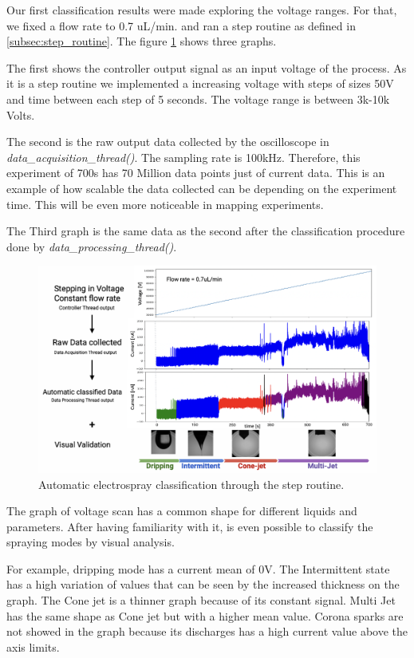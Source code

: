 Our first classification results were made exploring the voltage ranges. 
For that, we fixed a flow rate to 0.7 uL/min. and ran a step routine as defined in \ref{subsec:step_routine}. 
The figure \ref{fig:step_class} shows three graphs. 

The first shows the controller output signal as an input voltage of the process. As it is a step routine we implemented a increasing voltage with steps of sizes 50V and time between each step of 5 seconds. The voltage range is between 3k-10k Volts.

The second is the raw output data collected by the oscilloscope in \emph{data\_acquisition\_thread()}. 
The sampling rate is 100kHz. Therefore, this experiment of 700s has 70 Million data points just of current data. 
This is an example of how scalable the data collected can be depending on the experiment time. This will be even more noticeable in mapping experiments.

The Third graph is the same data as the second after the classification procedure done by \emph{data\_processing\_thread()}. 


\begin{figure}[H]
    \center
    \includegraphics[width=16cm]{Figuras/may/step_class.png}
    \caption{Automatic electrospray classification through the step routine.}
    \label{fig:step_class}
\end{figure}

The graph of voltage scan has a common shape for different liquids and parameters. After having familiarity with it, is even possible to classify the spraying modes by visual analysis. 

For example, dripping mode has a current mean of 0V. The Intermittent state has a high variation of values that can be seen by the increased thickness on the graph. The Cone jet is a thinner graph because of its constant signal. Multi Jet  has the same shape as Cone jet but with a higher mean value. Corona sparks are not showed in the graph because its discharges has a high current value above the axis limits.



